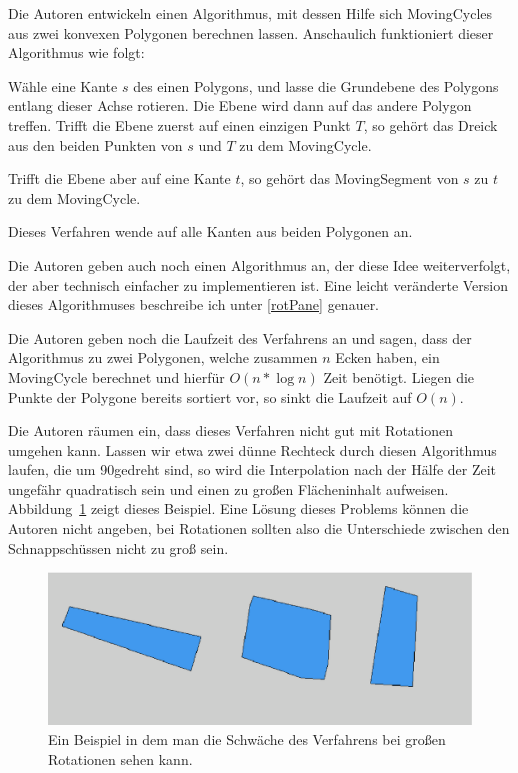 Die Autoren entwickeln einen Algorithmus, mit dessen Hilfe sich MovingCycles aus zwei konvexen Polygonen berechnen lassen. Anschaulich funktioniert dieser Algorithmus wie folgt:

Wähle eine Kante $s$ des einen Polygons, und lasse die Grundebene des Polygons entlang dieser Achse rotieren. Die Ebene wird dann auf das andere Polygon treffen. Trifft die Ebene zuerst auf einen einzigen Punkt $T$, so gehört das Dreick aus den beiden Punkten von $s$ und $T$ zu dem MovingCycle.

Trifft die Ebene aber auf eine Kante $t$, so gehört das MovingSegment von $s$ zu $t$ zu dem MovingCycle.

Dieses Verfahren wende auf alle Kanten aus beiden Polygonen an.

Die Autoren geben auch noch einen Algorithmus an, der diese Idee weiterverfolgt, der aber technisch einfacher zu implementieren ist. Eine leicht veränderte Version dieses Algorithmuses beschreibe ich unter \ref{rotPane} genauer.

Die Autoren geben noch die Laufzeit des Verfahrens an und sagen, dass der Algorithmus zu zwei Polygonen, welche zusammen $n$ Ecken haben, ein MovingCycle berechnet und hierfür $O(n*\log{n})$ Zeit benötigt. Liegen die Punkte der Polygone bereits sortiert vor, so sinkt die Laufzeit auf $O(n)$.

Die Autoren räumen ein, dass dieses Verfahren nicht gut mit Rotationen umgehen kann. Lassen wir etwa zwei dünne Rechteck durch diesen Algorithmus laufen, die um 90\degree gedreht sind, so wird die Interpolation nach der Hälfe der Zeit ungefähr quadratisch  sein und einen zu großen Flächeninhalt aufweisen. Abbildung~\ref{fig:BeispielschlechteRot} zeigt dieses Beispiel. Eine Lösung dieses Problems können die Autoren nicht angeben, bei Rotationen sollten also die Unterschiede zwischen den Schnappschüssen nicht zu groß sein.

\begin{figure}
	\centering
	\includegraphics[scale=0.6]{Rotation.eps}
	\caption{Ein Beispiel in dem man die Schwäche des Verfahrens bei großen Rotationen sehen kann.}
	\label{fig:BeispielschlechteRot}
\end{figure}

